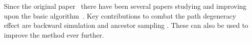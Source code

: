 Since the original \pmcmc paper~\citep{andrieu2009pseudo} there have been several papers studying %
and improving upon the basic \pg algorithm~\citep{chopin2015,lindsten2015uniform}. Key contributions to combat the path degeneracy effect are backward simulation \citep{whiteley2010efficient,lindsten2013backward}
and ancestor sampling \citep{lindstenJS2014}. These can also be used to improve the \ipmcmc method ever further.  





